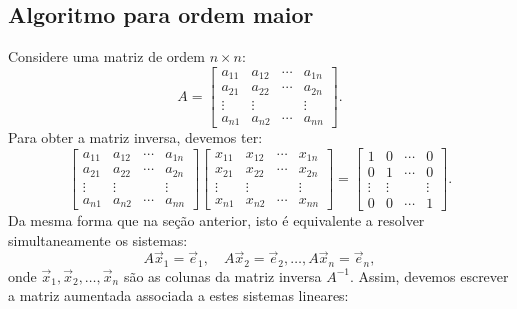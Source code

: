 \subsection{Algoritmo para ordem maior}\label{scn:alg-ordem-maior}

Considere uma matriz de ordem $n \times n$:
\begin{equation}
A =
\left[
\begin{array}{cccc}
a_{11} & a_{12} & \cdots & a_{1n} \\
a_{21} & a_{22} & \cdots & a_{2n} \\
\vdots & \vdots &        & \vdots \\
a_{n1} & a_{n2} & \cdots & a_{nn} 
\end{array}
\right].
\end{equation} Para obter a matriz inversa, devemos ter:
\begin{equation}
\left[
\begin{array}{cccc}
a_{11} & a_{12} & \cdots & a_{1n} \\
a_{21} & a_{22} & \cdots & a_{2n} \\
\vdots & \vdots &        & \vdots \\
a_{n1} & a_{n2} & \cdots & a_{nn} 
\end{array}
\right]
\left[
\begin{array}{cccc}
x_{11} & x_{12} & \cdots & x_{1n} \\
x_{21} & x_{22} & \cdots & x_{2n} \\
\vdots & \vdots &        & \vdots \\
x_{n1} & x_{n2} & \cdots & x_{nn} 
\end{array}
\right]
=
\left[
\begin{array}{cccc}
1   &    0   & \cdots &    0   \\
0   &    1   & \cdots &    0   \\
\vdots & \vdots &        & \vdots \\
0   &    0   & \cdots &    1   
\end{array}
\right].
\end{equation} Da mesma forma que na seção anterior, isto é equivalente a resolver simultaneamente os sistemas:
\begin{equation}
A \vec{x}_1 = \vec{e}_1, \quad A \vec{x}_2 = \vec{e}_2, \dots, A \vec{x}_n = \vec{e}_n,
\end{equation} onde $\vec{x}_1, \vec{x}_2, \dots, \vec{x}_n$ são as colunas da matriz inversa $A^{-1}$. Assim, devemos escrever a matriz aumentada associada a estes sistemas lineares:
